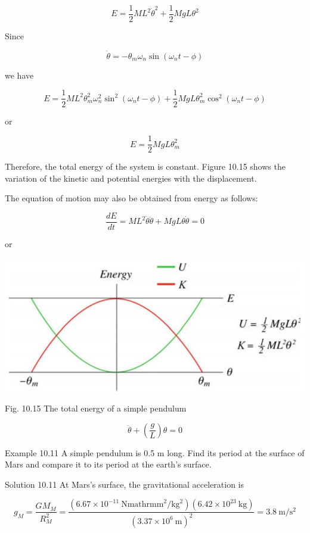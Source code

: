 \documentclass[10pt]{article}
\begin{document}
$$
E=\frac{1}{2} M L^{2} \dot{\theta}^{2}+\frac{1}{2} M g L \theta^{2}
$$

Since

$$
\dot{\theta}=-\theta_{m} \omega_{n} \sin \left(\omega_{n} t-\phi\right)
$$

we have

$$
E=\frac{1}{2} M L^{2} \theta_{m}^{2} \omega_{n}^{2} \sin ^{2}\left(\omega_{n} t-\phi\right)+\frac{1}{2} M g L \theta_{m}^{2} \cos ^{2}\left(\omega_{n} t-\phi\right)
$$

or

$$
E=\frac{1}{2} M g L \theta_{m}^{2}
$$

Therefore, the total energy of the system is constant. Figure 10.15 shows the variation of the kinetic and potential energies with the displacement.

The equation of motion may also be obtained from energy as follows:

$$
\frac{d E}{d t}=M L^{2} \dot{\theta} \ddot{\theta}+M g L \theta \dot{\theta}=0
$$

or

\begin{center}
\includegraphics[max width=\textwidth]{2024_09_13_db1f357d2aad0a03eb2eg-170}
\end{center}

Fig. 10.15 The total energy of a simple pendulum

$$
\ddot{\theta}+\left(\frac{g}{L}\right) \theta=0
$$

Example 10.11 A simple pendulum is 0.5 m long. Find its period at the surface of Mars and compare it to its period at the earth's surface.

Solution 10.11 At Mars's surface, the gravitational acceleration is

$$
g_{M}=\frac{G M_{M}}{R_{M}^{2}}=\frac{\left(6.67 \times 10^{-11} \mathrm{~N} \mathrm{mathrmm}^{2} / \mathrm{kg}^{2}\right)\left(6.42 \times 10^{23} \mathrm{~kg}\right)}{\left(3.37 \times 10^{6} \mathrm{~m}\right)^{2}}=3.8 \mathrm{~m} / \mathrm{s}^{2}
$$
\end{document}
